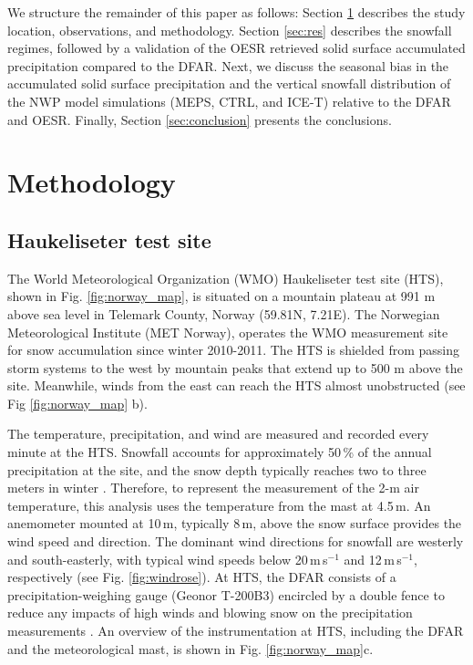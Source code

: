 \documentclass{ametsocV5}
\begin{document}
    We structure the remainder of this paper as follows: Section \ref{sec:methodology} describes the study location, observations, and methodology. Section \ref{sec:res} describes the snowfall regimes, followed by a validation of the OESR retrieved solid surface accumulated precipitation compared to the DFAR. Next, we discuss the seasonal bias in the accumulated solid surface precipitation and the vertical snowfall distribution of the NWP model simulations (MEPS, CTRL, and ICE-T) relative to the DFAR and OESR. Finally, Section \ref{sec:conclusion} presents the conclusions.


\section{Methodology}\label{sec:methodology}
	\subsection{Haukeliseter test site}
		The World Meteorological Organization (WMO) Haukeliseter test site (HTS), shown in Fig. \ref{fig:norway_map}, is situated on a mountain plateau at 991 m above sea level in Telemark County, Norway (59.81\textdegree N, 7.21\textdegree E). The Norwegian Meteorological Institute (MET Norway), operates the WMO measurement site for snow accumulation since winter 2010-2011. The HTS is shielded from passing storm systems to the west by mountain peaks that extend up to 500 m above the site. Meanwhile, winds from the east can reach the HTS almost unobstructed (see Fig \ref{fig:norway_map} b).  

		The temperature, precipitation, and wind are measured and recorded every minute at the HTS. Snowfall accounts for approximately 50\,\% of the annual precipitation at the site, and the snow depth typically reaches two to three meters in winter \citep{wolff_derivation_2015}. Therefore, to represent the measurement of the 2-m air temperature, this analysis uses the temperature from the mast at 4.5\,m. An anemometer mounted at 10\,m, typically 8\,m, above the snow surface provides the wind speed and direction. The dominant wind directions for snowfall are westerly and south-easterly, with typical wind speeds below 20\,m\,s$^{-1}$ and 12\,m\,s$^{-1}$, respectively (see Fig. \ref{fig:windrose}). At HTS, the DFAR consists of a precipitation-weighing gauge (Geonor T-200B3) encircled by a double fence to reduce any impacts of high winds and blowing snow on the precipitation measurements \citep{goodison_wmo_1998}. An overview of the instrumentation at HTS, including the DFAR and the meteorological mast, is shown in Fig. \ref{fig:norway_map}c. 
\end{document}
